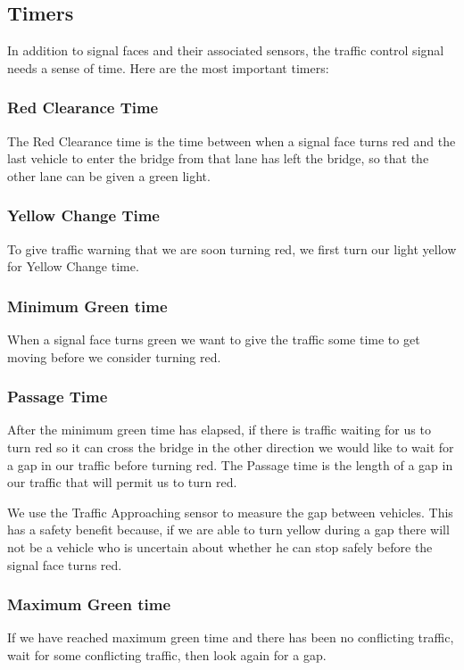 \documentclass[letterpaper,twoside]{article}
\begin{document}
\subsection{Timers}

In addition to signal faces and their associated sensors, the
traffic control signal needs a sense of time.  Here are the most
important timers:

\subsubsection{Red Clearance Time}
The Red Clearance time is the time between when a signal face turns red
and the last vehicle to enter the bridge from that lane has left the
bridge, so that the other lane can be given a green light.

\subsubsection{Yellow Change Time}
To give traffic warning that we are soon turning red, we first turn our light
yellow for Yellow Change time.

\subsubsection{Minimum Green time}
When a signal face turns green we want to give the traffic some time
to get moving before we consider turning red.

\subsubsection{Passage Time}
After the minimum green time has elapsed, if there is traffic waiting for
us to turn red so it can cross the bridge in the other direction
we would like to wait for a gap in our traffic before turning red.
The Passage time is the length of a gap in our traffic that will permit us
to turn red.

We use the Traffic Approaching sensor to measure the gap between vehicles.
This has a safety benefit because, if we are able to turn yellow during
a gap there will not be a vehicle who is uncertain about whether he can
stop safely before the signal face turns red.

\subsubsection{Maximum Green time}
If we have reached maximum green time and there has been no conflicting
traffic, wait for some conflicting traffic, then look again for a gap.
\end{document}
